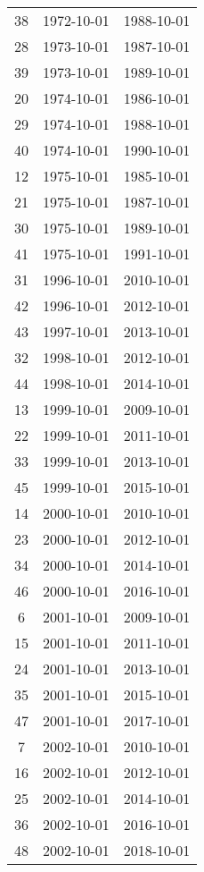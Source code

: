 % 
\begin{tabular}{ccc}
  \hline
  \hline
38 & 1972-10-01 & 1988-10-01 \\ 
  28 & 1973-10-01 & 1987-10-01 \\ 
  39 & 1973-10-01 & 1989-10-01 \\ 
  20 & 1974-10-01 & 1986-10-01 \\ 
  29 & 1974-10-01 & 1988-10-01 \\ 
  40 & 1974-10-01 & 1990-10-01 \\ 
  12 & 1975-10-01 & 1985-10-01 \\ 
  21 & 1975-10-01 & 1987-10-01 \\ 
  30 & 1975-10-01 & 1989-10-01 \\ 
  41 & 1975-10-01 & 1991-10-01 \\ 
  31 & 1996-10-01 & 2010-10-01 \\ 
  42 & 1996-10-01 & 2012-10-01 \\ 
  43 & 1997-10-01 & 2013-10-01 \\ 
  32 & 1998-10-01 & 2012-10-01 \\ 
  44 & 1998-10-01 & 2014-10-01 \\ 
  13 & 1999-10-01 & 2009-10-01 \\ 
  22 & 1999-10-01 & 2011-10-01 \\ 
  33 & 1999-10-01 & 2013-10-01 \\ 
  45 & 1999-10-01 & 2015-10-01 \\ 
  14 & 2000-10-01 & 2010-10-01 \\ 
  23 & 2000-10-01 & 2012-10-01 \\ 
  34 & 2000-10-01 & 2014-10-01 \\ 
  46 & 2000-10-01 & 2016-10-01 \\ 
  6 & 2001-10-01 & 2009-10-01 \\ 
  15 & 2001-10-01 & 2011-10-01 \\ 
  24 & 2001-10-01 & 2013-10-01 \\ 
  35 & 2001-10-01 & 2015-10-01 \\ 
  47 & 2001-10-01 & 2017-10-01 \\ 
  7 & 2002-10-01 & 2010-10-01 \\ 
  16 & 2002-10-01 & 2012-10-01 \\ 
  25 & 2002-10-01 & 2014-10-01 \\ 
  36 & 2002-10-01 & 2016-10-01 \\ 
  48 & 2002-10-01 & 2018-10-01 \\ 

\end{tabular}
